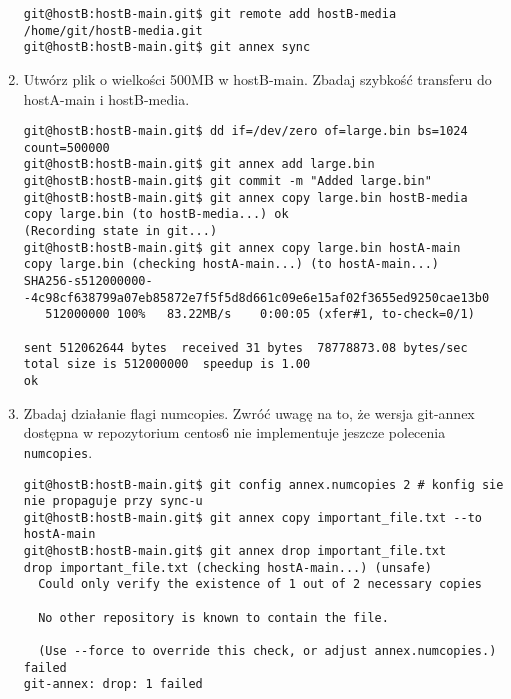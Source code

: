 \documentclass[polish]{article}
\begin{document}
\begin{enumerate}
\begin{lstlisting}
git@hostB:hostB-main.git$ git remote add hostB-media /home/git/hostB-media.git
git@hostB:hostB-main.git$ git annex sync
   \end{lstlisting}

\item Utwórz plik o wielkości 500MB w hostB-main.
   Zbadaj szybkość transferu do hostA-main i hostB-media.

   \begin{lstlisting}
git@hostB:hostB-main.git$ dd if=/dev/zero of=large.bin bs=1024 count=500000
git@hostB:hostB-main.git$ git annex add large.bin
git@hostB:hostB-main.git$ git commit -m "Added large.bin"
git@hostB:hostB-main.git$ git annex copy large.bin hostB-media
copy large.bin (to hostB-media...) ok
(Recording state in git...)
git@hostB:hostB-main.git$ git annex copy large.bin hostA-main
copy large.bin (checking hostA-main...) (to hostA-main...)
SHA256-s512000000--4c98cf638799a07eb85872e7f5f5d8d661c09e6e15af02f3655ed9250cae13b0
   512000000 100%   83.22MB/s    0:00:05 (xfer#1, to-check=0/1)

sent 512062644 bytes  received 31 bytes  78778873.08 bytes/sec
total size is 512000000  speedup is 1.00
ok
   \end{lstlisting}

\item Zbadaj działanie flagi numcopies.
   Zwróć uwagę na to, że wersja git-annex dostępna w repozytorium centos6 nie
   implementuje jeszcze polecenia \texttt{numcopies}.

   \begin{lstlisting}
git@hostB:hostB-main.git$ git config annex.numcopies 2 # konfig sie nie propaguje przy sync-u
git@hostB:hostB-main.git$ git annex copy important_file.txt --to hostA-main
git@hostB:hostB-main.git$ git annex drop important_file.txt
drop important_file.txt (checking hostA-main...) (unsafe)
  Could only verify the existence of 1 out of 2 necessary copies

  No other repository is known to contain the file.

  (Use --force to override this check, or adjust annex.numcopies.)
failed
git-annex: drop: 1 failed
   \end{lstlisting}

\end{enumerate}
\end{document}
